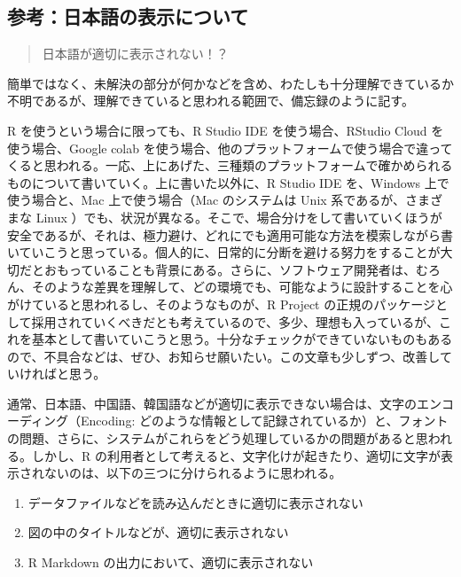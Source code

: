 \documentclass[
]{bxjsbook}
\providecommand{\tightlist}{%
  \setlength{\itemsep}{0pt}\setlength{\parskip}{0pt}}
\theoremstyle{definition}
\theoremstyle{definition}
\theoremstyle{definition}
\theoremstyle{definition}
\theoremstyle{remark}
\begin{document}
\hypertarget{ux53c2ux8003ux65e5ux672cux8a9eux306eux8868ux793aux306bux3064ux3044ux3066}{%
\subsection{参考：日本語の表示について}\label{ux53c2ux8003ux65e5ux672cux8a9eux306eux8868ux793aux306bux3064ux3044ux3066}}

\begin{quote}
日本語が適切に表示されない！？
\end{quote}

簡単ではなく、未解決の部分が何かなどを含め、わたしも十分理解できているか不明であるが、理解できていると思われる範囲で、備忘録のように記す。

R を使うという場合に限っても、R Studio IDE を使う場合、RStudio Cloud を使う場合、Google colab を使う場合、他のプラットフォームで使う場合で違ってくると思われる。一応、上にあげた、三種類のプラットフォームで確かめられるものについて書いていく。上に書いた以外に、R Studio IDE を、Windows 上で使う場合と、Mac 上で使う場合（Mac のシステムは Unix 系であるが、さまざまな Linux ）でも、状況が異なる。そこで、場合分けをして書いていくほうが安全であるが、それは、極力避け、どれにでも適用可能な方法を模索しながら書いていこうと思っている。個人的に、日常的に分断を避ける努力をすることが大切だとおもっていることも背景にある。さらに、ソフトウェア開発者は、むろん、そのような差異を理解して、どの環境でも、可能なように設計することを心がけていると思われるし、そのようなものが、R Project の正規のパッケージとして採用されていくべきだとも考えているので、多少、理想も入っているが、これを基本として書いていこうと思う。十分なチェックができていないものもあるので、不具合などは、ぜひ、お知らせ願いたい。この文章も少しずつ、改善していければと思う。

通常、日本語、中国語、韓国語などが適切に表示できない場合は、文字のエンコーディング（Encoding: どのような情報として記録されているか）と、フォントの問題、さらに、システムがこれらをどう処理しているかの問題があると思われる。しかし、R の利用者として考えると、文字化けが起きたり、適切に文字が表示されないのは、以下の三つに分けられるように思われる。

\begin{enumerate}
\def\labelenumi{\arabic{enumi}.}
\tightlist
\item
  データファイルなどを読み込んだときに適切に表示されない
\item
  図の中のタイトルなどが、適切に表示されない
\item
  R Markdown の出力において、適切に表示されない
\end{enumerate}
\end{document}
